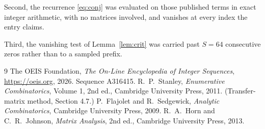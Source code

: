 \documentclass[11pt,a4paper]{article}
\theoremstyle{plain}
\theoremstyle{definition}
\begin{document}
Second, the recurrence \eqref{eq:conj} was evaluated on those published terms in exact
integer arithmetic, with no matrices involved, and vanishes at every index the entry claims.

Third, the vanishing test of Lemma~\ref{lem:crit} was carried past $S=64$ consecutive
zeros rather than to a sampled prefix.

\begin{thebibliography}{9}
 The OEIS Foundation, \emph{The On-Line Encyclopedia of Integer
Sequences}, \url{https://oeis.org}, 2026. Sequence A316415.
 R.~P.~Stanley, \emph{Enumerative Combinatorics}, Volume 1, 2nd ed.,
Cambridge University Press, 2011. (Transfer-matrix method, Section 4.7.)
 P.~Flajolet and R.~Sedgewick, \emph{Analytic Combinatorics}, Cambridge
University Press, 2009.
 R.~A.~Horn and C.~R.~Johnson, \emph{Matrix Analysis}, 2nd ed., Cambridge
University Press, 2013.
\end{thebibliography}
\end{document}
